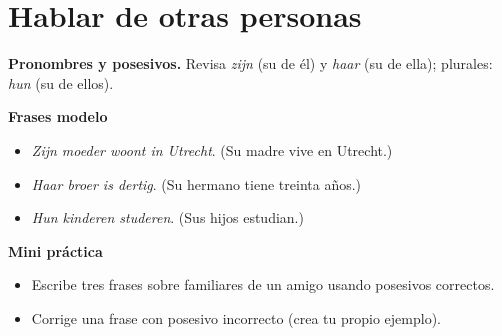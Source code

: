\section{Hablar de otras personas}
\textbf{Pronombres y posesivos.} Revisa \textit{zijn} (su de él) y \textit{haar} (su de ella); plurales: \textit{hun} (su de ellos).

\textbf{Frases modelo}
\begin{itemize}[leftmargin=*]
  \item \textit{Zijn moeder woont in Utrecht}. (Su madre vive en Utrecht.)
  \item \textit{Haar broer is dertig}. (Su hermano tiene treinta años.)
  \item \textit{Hun kinderen studeren}. (Sus hijos estudian.)
\end{itemize}

\textbf{Mini práctica}
\begin{itemize}[leftmargin=*]
  \item Escribe tres frases sobre familiares de un amigo usando posesivos correctos.
  \item Corrige una frase con posesivo incorrecto (crea tu propio ejemplo).
\end{itemize}
